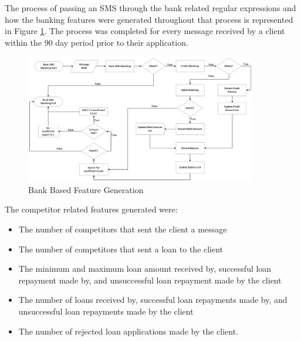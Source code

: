 \vspace{10pt}

The process of passing an SMS through the bank related regular expressions and how the banking features were generated throughout that process is represented in Figure \ref{fig:bank_features}. The process was completed for every message received by a client within the 90 day period prior to their application. 

\vspace{10pt}

\begin{figure}[!htb]
\centering
\includegraphics[width=0.9\textwidth]{images/bank_feats.png}
\caption{Bank Based Feature Generation}
\label{fig:bank_features}
\end{figure}

\vspace{10pt}

\newpage

The competitor related features generated were:

\begin{itemize}
    \item The number of competitors that sent the client a message
    \item The number of competitors that sent a loan to the client
    \item The minimum and maximum loan amount received by, successful loan repayment made by, and unsuccessful loan repayment made by the client
    \item The number of loans received by, successful loan repayments made by, and unsuccessful loan repayments made by the client
    \item The number of rejected loan applications made by the client. 
\end{itemize}

\vspace{10pt}

